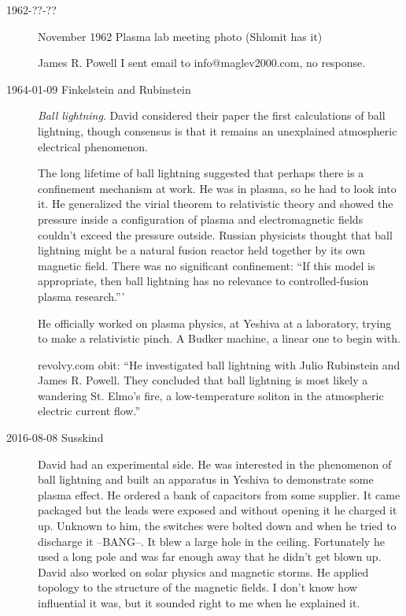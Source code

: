 \begin{description}

\item[1962-??-??]
November 1962 Plasma lab meeting photo (Shlomit has it)

 {James R. Powell}
I sent email to info@maglev2000.com, no response.

\item[1964-01-09 Finkelstein and Rubinstein] {\em Ball lightning}. 	David
considered their paper the first calculations of ball
lightning, though consensus is that it remains an unexplained
 {atmospheric
electrical phenomenon}.

The long lifetime of ball lightning suggested that perhaps there is a
confinement mechanism at work. He was in plasma, so he had to look into
it. He generalized the virial theorem to relativistic theory and showed
the pressure inside a configuration of plasma and electromagnetic fields
couldn't exceed the pressure outside. Russian physicists thought that
ball lightning might be a natural fusion reactor held together by its own
magnetic field. There was no significant confinement: ``If this model is
appropriate, then ball lightning has no relevance to controlled-fusion
plasma research.'''

He officially worked on plasma physics, at Yeshiva at a laboratory,
trying to make a relativistic pinch. A Budker machine, a linear one to
begin with.

{revolvy.com obit}:
``He investigated ball lightning with Julio Rubinstein and James R.
Powell. They concluded that ball lightning is most likely a wandering St.
Elmo's fire, a low-temperature soliton in the atmospheric electric
current flow.''

\item[2016-08-08 Susskind]
David had an experimental side. He was interested in the phenomenon of
ball lightning and built an apparatus in Yeshiva to demonstrate some
plasma effect. He ordered a bank of capacitors from some supplier. It
came packaged but the leads were exposed and without opening it he
charged it up. Unknown to him, the switches were bolted down and when he
tried to discharge it --BANG--. It blew a large hole in the ceiling.
Fortunately he used a long pole and was far enough away that he didn't
get blown up.
David also worked on solar physics and magnetic storms. He applied
topology to the structure of the magnetic fields. I don't know how
influential it was, but it sounded right to me when he explained it.


\end{description}
